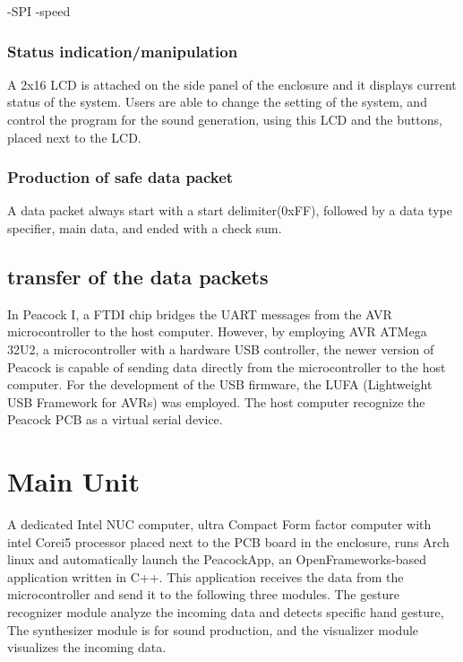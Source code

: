 \documentclass{nime-alternate}
\begin{document}
-SPI 
-speed

\subsubsection{Status indication/manipulation} %

A 2x16 LCD is attached on the side panel of the enclosure and it displays current status of the system. Users are able to change the setting of the system, and control the program for the sound generation, using this LCD and the buttons, placed next to the LCD.

\subsubsection{Production of safe data packet} %

A data packet always start with a start delimiter(0xFF), followed by a data type specifier, main data, and ended with a check sum. 

\subsection{transfer of the data packets} %

In Peacock I, a FTDI chip bridges the UART messages from the AVR microcontroller to the host computer.
However, by employing AVR ATMega 32U2, a microcontroller with a hardware USB controller, the newer version of Peacock is capable of sending data directly from the microcontroller to the host computer. For the development of the USB firmware, the LUFA (Lightweight USB Framework for AVRs)\cite{camera:lufa} was employed. The host computer recognize the Peacock PCB as a virtual serial device.

\section{Main Unit} %
A dedicated Intel NUC computer, ultra Compact Form factor computer with intel Corei5 processor placed next to the PCB board in the enclosure, runs Arch linux and automatically launch the PeacockApp, an OpenFrameworks\cite{openframeworks}-based application written in C++. This application receives the data from the microcontroller and send it to the following three modules. The gesture recognizer module analyze the incoming data and detects specific hand gesture, The synthesizer module is for sound production, and the visualizer module visualizes the incoming data.
\end{document}
